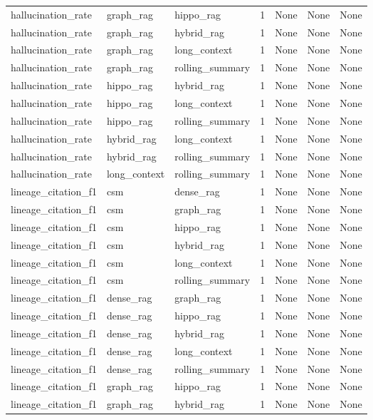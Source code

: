 \begin{tabular}{lllllll}
hallucination\_rate & graph\_rag & hippo\_rag & 1 & None & None & None \\
hallucination\_rate & graph\_rag & hybrid\_rag & 1 & None & None & None \\
hallucination\_rate & graph\_rag & long\_context & 1 & None & None & None \\
hallucination\_rate & graph\_rag & rolling\_summary & 1 & None & None & None \\
hallucination\_rate & hippo\_rag & hybrid\_rag & 1 & None & None & None \\
hallucination\_rate & hippo\_rag & long\_context & 1 & None & None & None \\
hallucination\_rate & hippo\_rag & rolling\_summary & 1 & None & None & None \\
hallucination\_rate & hybrid\_rag & long\_context & 1 & None & None & None \\
hallucination\_rate & hybrid\_rag & rolling\_summary & 1 & None & None & None \\
hallucination\_rate & long\_context & rolling\_summary & 1 & None & None & None \\
lineage\_citation\_f1 & csm & dense\_rag & 1 & None & None & None \\
lineage\_citation\_f1 & csm & graph\_rag & 1 & None & None & None \\
lineage\_citation\_f1 & csm & hippo\_rag & 1 & None & None & None \\
lineage\_citation\_f1 & csm & hybrid\_rag & 1 & None & None & None \\
lineage\_citation\_f1 & csm & long\_context & 1 & None & None & None \\
lineage\_citation\_f1 & csm & rolling\_summary & 1 & None & None & None \\
lineage\_citation\_f1 & dense\_rag & graph\_rag & 1 & None & None & None \\
lineage\_citation\_f1 & dense\_rag & hippo\_rag & 1 & None & None & None \\
lineage\_citation\_f1 & dense\_rag & hybrid\_rag & 1 & None & None & None \\
lineage\_citation\_f1 & dense\_rag & long\_context & 1 & None & None & None \\
lineage\_citation\_f1 & dense\_rag & rolling\_summary & 1 & None & None & None \\
lineage\_citation\_f1 & graph\_rag & hippo\_rag & 1 & None & None & None \\
lineage\_citation\_f1 & graph\_rag & hybrid\_rag & 1 & None & None & None \\

\end{tabular}
